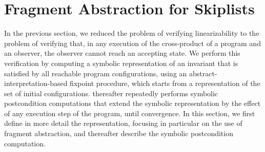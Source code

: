 \section{Fragment Abstraction for Skiplists}
\label{sec:fragment-abstraction}
In the previous section, we reduced the problem of verifying linearizability
to the problem of verifying
that, in any execution of the cross-product of a program and an observer, 
the observer cannot reach an accepting state.
We perform this verification by  computing a symbolic representation
of an invariant that is satisfied by all reachable program configurations,
using an abstract-interpretation-based
fixpoint procedure, which starts
from a representation of the set of initial configurations.
thereafter repeatedly performs
symbolic postcondition computations that extend the
symbolic representation by the effect of any execution step of the program,
until convergence.
In this section, we first define in more detail the representation,
focusing in particular on the use of fragment abstraction, and thereafter
describe the symbolic postcondition computation. 






